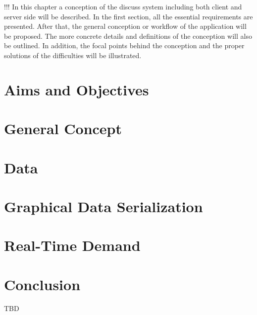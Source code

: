 !!! In this chapter a conception of the discuss system including both client and server side will be described. In the first section, all the essential requirements are presented. After that, the general conception or workflow of the application will be proposed. The more concrete details and definitions of the conception will also be outlined. In addition, the focal points behind the conception and the proper solutions of the difficulties will be illustrated.


\section{Aims and Objectives}\label{sec:aims}

\section{General Concept}

\section{Data}\label{sec:data-concept}

\section{Graphical Data Serialization}\label{sec:graphical-data-serialization-concept}

\section{Real-Time Demand}\label{sec:realtime-concept}


% 

\section{Conclusion}
TBD
